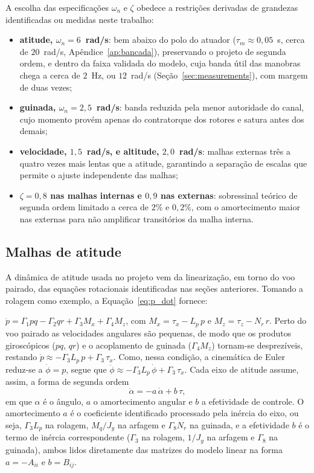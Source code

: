 A escolha das especificações $\omega_n$ e $\zeta$ obedece a restrições derivadas de grandezas identificadas ou medidas neste trabalho:
{\color{blue}\begin{itemize}
    \item \textbf{atitude, $\omega_n = 6$~rad/s}: bem abaixo do polo do atuador ($\tau_m \approx 0{,}05$~s, cerca de $20$~rad/s, Apêndice~\ref{ap:bancada}), preservando o projeto de segunda ordem, e dentro da faixa validada do modelo, cuja banda útil das manobras chega a cerca de $2$~Hz, ou $12$~rad/s (Seção~\ref{sec:measurements}), com margem de duas vezes;
    \item \textbf{guinada, $\omega_n = 2{,}5$~rad/s}: banda reduzida pela menor autoridade do canal, cujo momento provém apenas do contratorque dos rotores e satura antes dos demais;
    \item \textbf{velocidade, $1{,}5$~rad/s, e altitude, $2{,}0$~rad/s}: malhas externas três a quatro vezes mais lentas que a atitude, garantindo a separação de escalas que permite o ajuste independente das malhas;
    \item \textbf{$\zeta = 0{,}8$ nas malhas internas e $0{,}9$ nas externas}: sobressinal teórico de segunda ordem limitado a cerca de $2\%$ e $0{,}2\%$, com o amortecimento maior nas externas para não amplificar transitórios da malha interna.
\end{itemize}}

\subsection{Malhas de atitude}

A dinâmica de atitude usada no projeto vem da linearização, em torno do voo pairado, das equações rotacionais identificadas nas seções anteriores. Tomando a rolagem como exemplo, a Equação~\eqref{eq:p_dot} fornece: 

$\dot p=\Gamma_1 pq-\Gamma_2 qr+\Gamma_3 M_x+\Gamma_4 M_z$, com $M_x=\tau_x-L_p\,p$ e $M_z=\tau_z-N_r\,r$. 
Perto do voo pairado as velocidades angulares são pequenas, de modo que os produtos giroscópicos ($pq$, $qr$) e o acoplamento de guinada ($\Gamma_4 M_z$) tornam-se desprezíveis, restando $\dot p\approx -\Gamma_3 L_p\,p+\Gamma_3\,\tau_x$. Como, nessa condição, a cinemática de Euler reduz-se a $\dot\phi=p$, segue que $\ddot\phi\approx-\Gamma_3 L_p\,\dot\phi+\Gamma_3\,\tau_x$. Cada eixo de atitude assume, assim, a forma de segunda ordem
\begin{equation}
\ddot{\alpha}=-a\,\dot{\alpha}+b\,\tau,
\label{eq:att-2ord}
\end{equation}
em que $\alpha$ é o ângulo, $a$ o amortecimento angular e $b$ a efetividade de controle. O amortecimento $a$ é o coeficiente identificado processado pela inércia do eixo, ou seja, $\Gamma_3 L_p$ na rolagem, $M_q/J_y$ na arfagem e $\Gamma_8 N_r$ na guinada, e a efetividade $b$ é o termo de inércia correspondente ($\Gamma_3$ na rolagem, $1/J_y$ na arfagem e $\Gamma_8$ na guinada), ambos lidos diretamente das matrizes do modelo linear na forma $a=-A_{ii}$ e $b=B_{ij}$.

